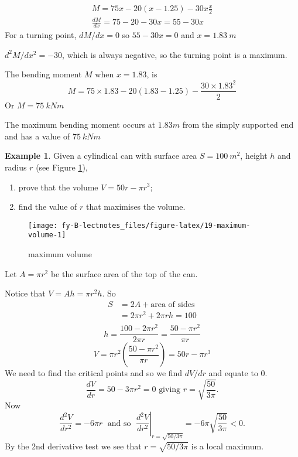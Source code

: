 \documentclass[
  11pt,
  oneside]{book}
\providecommand{\tightlist}{%
  \setlength{\itemsep}{0pt}\setlength{\parskip}{0pt}}
\newcommand{\slide}{}
\theoremstyle{definition}
\theoremstyle{definition}
\newtheorem{example}{Example}[chapter]
\theoremstyle{definition}
\theoremstyle{definition}
\theoremstyle{remark}
\begin{document}
\begin{gather*}
M = 75x - 20(x-1.25) - 30x\frac{x}{2}\\
\frac{dM}{dx} = 75-20-30x = 55 - 30x
\end{gather*}
For a turning point, \(dM/dx=0\) so \(55 - 30x = 0\) and \(x = 1.83\ m\)

\(d^2M/dx^2 = -30\), which is always negative, so the turning point is a maximum.

The bending moment \(M\) when \(x = 1.83\), is
\[
M = 75\times1.83 - 20(1.83 - 1.25) - \frac{30\times1.83^2}{2}
\]
Or \(M = 75\ kNm\)

The maximum bending moment occurs at \(1.83 m\) from the simply supported end and has a value of \(75\ kNm\)
\slide

\begin{example}

Given a cylindical can with surface area \(S=100\ m^2\), height \(h\) and radius \(r\) (see Figure \ref{fig:19-maximum-volume}),

\begin{enumerate}
\def\labelenumi{\arabic{enumi}.}
\tightlist
\item
  prove that the volume \(V = 50r-\pi r^3\);
\item
  find the value of \(r\) that maximises the volume.
\end{enumerate}

\end{example}

\begin{figure}

{\centering \texttt{[image: fy-B-lectnotes\_files/figure-latex/19-maximum-volume-1]} 

}

\caption{maximum volume}\label{fig:19-maximum-volume}
\end{figure}

Let \(A=\pi r^2\) be the surface area of the top of the can.

Notice that \(V = Ah = \pi r^2h\). So
\[
\begin{array}{rl}
S&=2A + \text{area of sides}\\
&=2\pi r^2 + 2\pi rh = 100\\
\end{array}
\]
\[
h=\frac{100-2\pi r^2}{2\pi r}=\frac{50-\pi r^2}{\pi r}
\]
\[
V=\pi r^2\left(\frac{50-\pi r^2}{\pi r}\right) = 50r -\pi r^3
\]
We need to find the critical points and so we find \(dV/dr\) and equate to 0.
\[
\frac{dV}{dr} = 50-3\pi r^2 = 0\text{ giving }r = \sqrt{\frac{50}{3\pi}}.
\]
Now
\[
\frac{d^2V}{dr^2} = -6\pi r\;\text{ and so }\;\left.\frac{d^2V}{dr^2}\right\vert_{r=\sqrt{50/3\pi}} = -6\pi\sqrt{\frac{50}{3\pi}}<0.
\]
By the 2nd derivative test we see that \(r=\sqrt{50/3\pi}\) is a local maximum.
\end{document}
